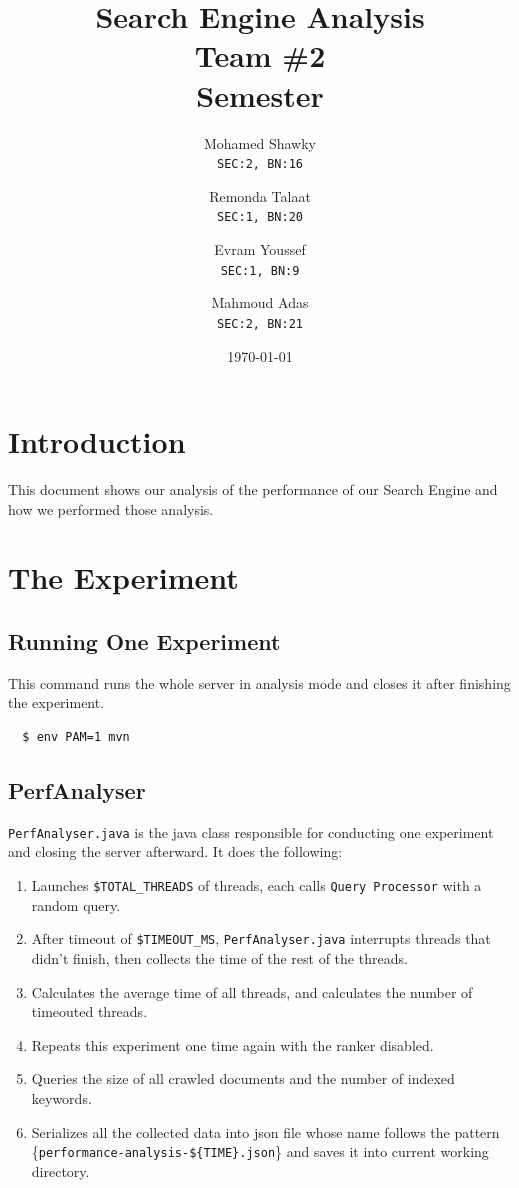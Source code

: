 \documentclass[12pt]{article}
\title{\textbf{Search Engine Analysis}\\Team \#2\\ Semester}
\author{
  Mohamed Shawky\\
  \small\texttt{SEC:2, BN:16}
  \and
  Remonda Talaat\\
  \small\texttt{SEC:1, BN:20}
  \and
  Evram Youssef\\
  \small\texttt{SEC:1, BN:9}
  \and
  Mahmoud Adas\\
  \small\texttt{SEC:2, BN:21}
}
\date{\today}
\begin{document}
\thispagestyle{empty}

\maketitle
\tableofcontents
\clearpage


\section{Introduction}
This document shows our analysis of the performance of our Search Engine and how we performed those analysis.

\section{The Experiment}
\subsection{Running One Experiment}
This command runs the whole server in analysis mode and closes it after finishing the experiment.
\begin{verbatim}
  $ env PAM=1 mvn
\end{verbatim}

\subsection{PerfAnalyser}
\texttt{PerfAnalyser.java} is the java class responsible for conducting one experiment and closing the server afterward. 
It does the following:
\begin{enumerate}
  \item Launches \texttt{\$TOTAL\_THREADS} of threads, each calls \texttt{Query Processor} with a random query.
  \item After timeout of \texttt{\$TIMEOUT\_MS}, \texttt{PerfAnalyser.java} interrupts threads that didn't finish, then collects the time of the rest of the threads.
  \item Calculates the average time of all threads, and calculates the number of timeouted threads.
  \item Repeats this experiment one time again with the ranker disabled.
  \item Queries the size of all crawled documents and the number of indexed keywords.
  \item Serializes all the collected data into json file whose name follows the pattern \{\texttt{performance-analysis-\$\{TIME\}.json}\} and saves it into current working directory.
\end{enumerate}
\end{document}
